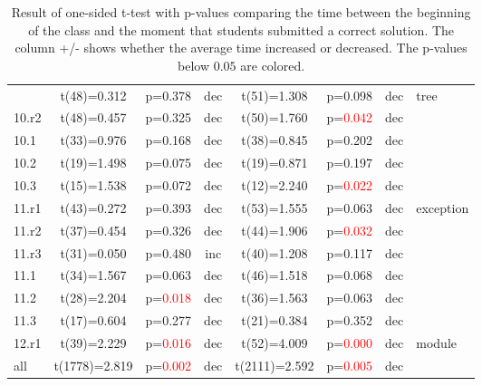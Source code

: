 \begin{table}
\begin{center}
\begin{tabular}{|l||c|c|c||c|c|c||l|}
    & t(48)=0.312 & p=0.378 & dec
    & t(51)=1.308 & p=0.098 & dec
    & tree\\ \cline{1-7}
    10.r2
    & t(48)=0.457 & p=0.325 & dec
    & t(50)=1.760 & p=\textcolor{red}{0.042} & dec
    & \\ \cline{1-7}
    10.1
    & t(33)=0.976 & p=0.168 & dec
    & t(38)=0.845 & p=0.202 & dec
    & \\ \cline{1-7}
    10.2
    & t(19)=1.498 & p=0.075 & dec
    & t(19)=0.871 & p=0.197 & dec
    & \\ \cline{1-7}
    10.3
    & t(15)=1.538 & p=0.072 & dec
    & t(12)=2.240 & p=\textcolor{red}{0.022} & dec
    & \\ \hline
    11.r1
    & t(43)=0.272 & p=0.393 & dec
    & t(53)=1.555 & p=0.063 & dec
    & exception\\ \cline{1-7}
    11.r2
    & t(37)=0.454 & p=0.326 & dec
    & t(44)=1.906 & p=\textcolor{red}{0.032} & dec
    & \\ \cline{1-7}
    11.r3
    & t(31)=0.050 & p=0.480 & inc
    & t(40)=1.208 & p=0.117 & dec
    & \\ \cline{1-7}
    11.1
    & t(34)=1.567 & p=0.063 & dec
    & t(46)=1.518 & p=0.068 & dec
    & \\ \cline{1-7}
    11.2
    & t(28)=2.204 & p=\textcolor{red}{0.018} & dec
    & t(36)=1.563 & p=0.063 & dec
    & \\ \cline{1-7}
    11.3
    & t(17)=0.604 & p=0.277 & dec
    & t(21)=0.384 & p=0.352 & dec
    & \\ \hline
    12.r1
    & t(39)=2.229 & p=\textcolor{red}{0.016} & dec
    & t(52)=4.009 & p=\textcolor{red}{0.000} & dec
    & module\\ \hline
    all
    & t(1778)=2.819 & p=\textcolor{red}{0.002} & dec
    & t(2111)=2.592 & p=\textcolor{red}{0.005} & dec
    & \\ \hline
  \end{tabular}
  \end{center}
  \caption{Result of one-sided t-test with p-values comparing the time between the beginning of the class and the moment that students submitted a correct solution.  The column +/- shows whether the average time increased or decreased.  The p-values below $0.05$ are colored.}
  \label{TableTTest}
\end{table}
